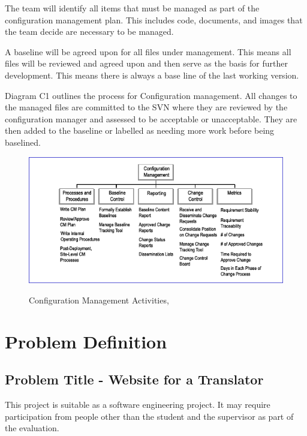 \documentclass{l3proj}
\begin{document}
The team will identify all items that must be managed as part of the configuration management plan.
This includes code, documents, and images that the team decide are necessary to be managed.

A baseline will be agreed upon for all files under management. This means all files will be reviewed and
agreed upon and then serve as the basis for further development. This means there is always a base line
of the last working version.

Diagram C1 outlines the process for Configuration management. 
All changes to the managed files are committed to the SVN where they are reviewed by the configuration
manager and assessed to be acceptable or unacceptable. They are then added to the baseline or labelled
as needing more work before being baselined.

\begin{figure}
\begin{center}
\label{fig:configman}
\includegraphics[scale=0.6]{config}
\caption{\small{Configuration Management Activities, \cite{gt}}}
\end{center}
\end{figure}


\chapter{Problem Definition}
\label{chap:prob-spec}
\section{Problem Title - Website for a Translator}

This project is suitable as a software engineering project. It may require participation from people
other than the student and the supervisor as part of the evaluation.
\end{document}
